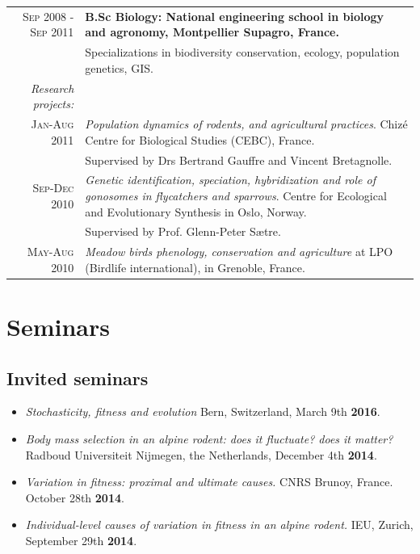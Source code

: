 \documentclass[a4paper,10pt]{article} %
\begin{document}
\begin{tabular}{r|p{11cm}}
\textsc{Sep 2008 - Sep 2011} & \textbf{B.Sc Biology: National engineering school in biology and agronomy, Montpellier Supagro, France.}\\
& \footnotesize{Specializations in biodiversity conservation, ecology, population genetics, GIS.}\\
\textit{Research projects:} & \\
\footnotesize{\textsc{Jan-Aug 2011}}& \emph{Population dynamics of rodents, and agricultural practices}. Chiz\'{e} Centre for Biological Studies (CEBC), France.\\ 
																		& \footnotesize{Supervised by Drs Bertrand Gauffre and Vincent Bretagnolle.} \par \\
\footnotesize{\textsc{Sep-Dec 2010}}&	\emph{Genetic identification, speciation, hybridization and role of gonosomes in flycatchers and sparrows}. Centre for Ecological and Evolutionary Synthesis in Oslo, Norway.\\
																		& \footnotesize{Supervised by Prof. Glenn-Peter S{\ae}tre.}\par \\
\footnotesize{\textsc{May-Aug 2010}}& \emph{Meadow birds phenology, conservation and agriculture} at LPO (Birdlife international), in Grenoble, France.
\end{tabular}



\section*{Seminars}
\subsection*{Invited seminars}
\begin{itemize}
\item \textit{Stochasticity, fitness and evolution} Bern, Switzerland, March 9th \textbf{2016}.
\item \textit{Body mass selection in an alpine rodent: does it fluctuate? does it matter?} Radboud Universiteit Nijmegen, the Netherlands, December 4th \textbf{2014}.
\item \textit{Variation in fitness: proximal and ultimate causes.} CNRS Brunoy, France. October 28th \textbf{2014}.
\item \textit{Individual-level causes of variation in fitness in an alpine rodent.} IEU, Zurich, September 29th \textbf{2014}.
\end{itemize}
\end{document}
